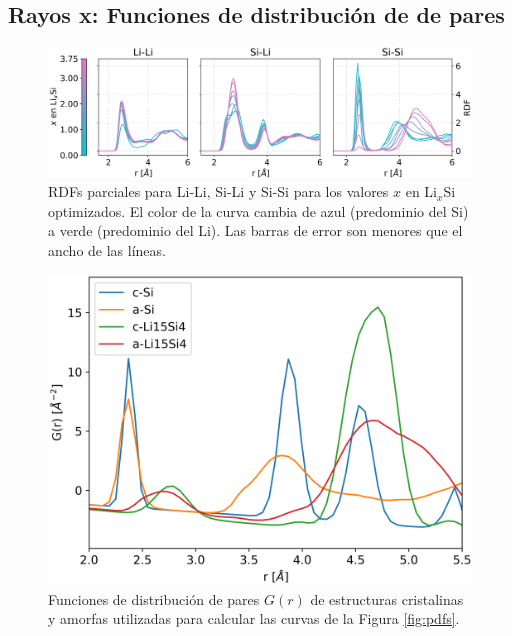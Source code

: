 \subsection{Rayos x: Funciones de distribución de de pares}

\begin{figure}[h!]
    \centering
    \includegraphics[width=\textwidth]{Silicio/prediccion/resultados/xray/prdfs.png}
    \caption{RDFs parciales para Li-Li, Si-Li y Si-Si para los valores $x$ en 
    Li$_x$Si optimizados. El color de la curva cambia de azul (predominio del Si)
    a verde (predominio del Li). Las barras de error son menores que el ancho de 
    las líneas.}
    \label{fig:prdfs}
\end{figure}

\begin{figure}[h!]
    \centering
    \includegraphics[width=.7\textwidth]{Silicio/prediccion/resultados/xray/gofrs.png}
    \caption{Funciones de distribución de pares $G(r)$ de estructuras 
    cristalinas y amorfas utilizadas para calcular las curvas de la Figura 
    \ref{fig:pdfs}.}
    \label{fig:gofrs}
\end{figure}

